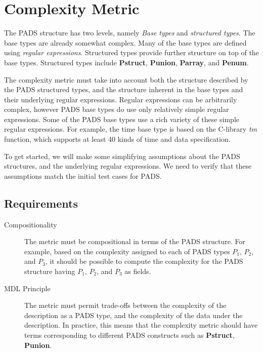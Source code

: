 \section{Complexity Metric}

The PADS structure has two levels, namely \textit{Base types} and
\textit{structured types}. The base types are already somewhat complex.
Many of the base types are defined using \textit{regular expressions}.
Structured types provide further structure on top of the base types.
Structured types include \textbf{Pstruct}, \textbf{Punion},
\textbf{Parray}, and \textbf{Penum}.

The complexity metric must take into account both the structure
described by the PADS structured types, and the structure inherent in
the base types and their underlying regular expressions. Regular
expressions can be arbitrarily complex, however PADS base types do use
only relatively simple regular expressions. Some of the PADS base
types use a rich variety of these simple regular expressions. For
example, the time base type is based on the C-library \textit{tm}
function, which supports at least 40 kinds of time and data
specification.

To get started, we will make some simplifying assumptions about the
PADS structures, and the underlying regular expressions. We need to
verify that these assumptions match the initial test cases for PADS.

\subsection{Requirements}

\begin{description}

\item [Compositionality]
The metric must be compositional in terms of the PADS structure.
For example, based on the complexity assigned to each of PADS
types $P_1$, $P_2$, and $P_3$, it should be possible to compute
the complexity for the PADS structure having $P_1$, $P_2$, and $P_3$
as fields.

\item [MDL Principle]
The metric must permit trade-offs between the complexity of the
description as a PADS type, and the complexity of the data under
the description. In practice, this means that the complexity metric
should have terms corresponding to different PADS constructs such
as \textbf{Pstruct}, \textbf{Punion}.

\end{description}

